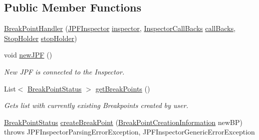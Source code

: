 \subsection*{Public Member Functions}
\begin{DoxyCompactItemize}
\item 
\hyperlink{classgov_1_1nasa_1_1jpf_1_1inspector_1_1server_1_1breakpoints_1_1_break_point_handler_a02484c9ccda9be250fad79d6d74f7293}{Break\+Point\+Handler} (\hyperlink{classgov_1_1nasa_1_1jpf_1_1inspector_1_1server_1_1jpf_1_1_j_p_f_inspector}{J\+P\+F\+Inspector} \hyperlink{classgov_1_1nasa_1_1jpf_1_1inspector_1_1server_1_1breakpoints_1_1_break_point_handler_a92e4bc8adfb985ae4efeef9bd96ee9e9}{inspector}, \hyperlink{interfacegov_1_1nasa_1_1jpf_1_1inspector_1_1interfaces_1_1_inspector_call_backs}{Inspector\+Call\+Backs} \hyperlink{classgov_1_1nasa_1_1jpf_1_1inspector_1_1server_1_1breakpoints_1_1_break_point_handler_a1ee790b3c2c618b92a860b38e9171bfc}{call\+Backs}, \hyperlink{classgov_1_1nasa_1_1jpf_1_1inspector_1_1server_1_1jpf_1_1_stop_holder}{Stop\+Holder} \hyperlink{classgov_1_1nasa_1_1jpf_1_1inspector_1_1server_1_1breakpoints_1_1_break_point_handler_ad9dd2efe1d9825c05a6c98e9d35ee459}{stop\+Holder})
\item 
void \hyperlink{classgov_1_1nasa_1_1jpf_1_1inspector_1_1server_1_1breakpoints_1_1_break_point_handler_a5ce9d9208aa952906c6e47e5b9225a71}{new\+J\+PF} ()
\begin{DoxyCompactList}\small\item\em New J\+PF is connected to the Inspector. \end{DoxyCompactList}\item 
List$<$ \hyperlink{interfacegov_1_1nasa_1_1jpf_1_1inspector_1_1interfaces_1_1_break_point_status}{Break\+Point\+Status} $>$ \hyperlink{classgov_1_1nasa_1_1jpf_1_1inspector_1_1server_1_1breakpoints_1_1_break_point_handler_a9de8d800ab9dffe690a493825ad7c592}{get\+Break\+Points} ()
\begin{DoxyCompactList}\small\item\em Gets list with currently existing Breakpoints created by user. \end{DoxyCompactList}\item 
\hyperlink{interfacegov_1_1nasa_1_1jpf_1_1inspector_1_1interfaces_1_1_break_point_status}{Break\+Point\+Status} \hyperlink{classgov_1_1nasa_1_1jpf_1_1inspector_1_1server_1_1breakpoints_1_1_break_point_handler_a50773b701aa855391dca9ff62defd749}{create\+Break\+Point} (\hyperlink{interfacegov_1_1nasa_1_1jpf_1_1inspector_1_1interfaces_1_1_break_point_creation_information}{Break\+Point\+Creation\+Information} new\+BP)  throws J\+P\+F\+Inspector\+Parsing\+Error\+Exception, J\+P\+F\+Inspector\+Generic\+Error\+Exception 

\end{DoxyCompactItemize}
